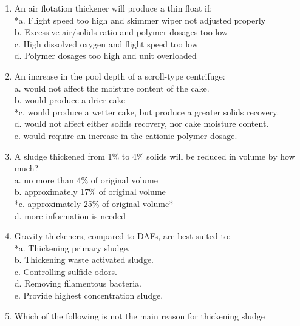 \begin{enumerate}
\item  An air flotation thickener will produce a thin float if: \\

*a. Flight speed too high and skimmer wiper not adjusted properly \\
b. Excessive air/solids ratio and polymer dosages too low \\
c. High dissolved oxygen and flight speed too low \\
d. Polymer dosages too high and unit overloaded \\

\item  An increase in the pool depth of a scroll-type centrifuge: \\

a. would not affect the moisture content of the cake. \\
b. would produce a drier cake \\
*c. would produce a wetter cake, but produce a greater solids recovery. \\
d. would not affect either solids recovery, nor cake moisture content. \\
e. would require an increase in the cationic polymer dosage. \\

\item  A sludge thickened from 1\% to 4\% solids will be reduced in volume by how much? \\

a. no more than 4\% of original volume \\
b. approximately 17\% of original volume \\
*c. approximately 25\% of original volume* \\
d. more information is needed \\

\item  Gravity thickeners, compared to DAFs, are best suited to: \\

*a. Thickening primary sludge. \\
b. Thickening waste activated sludge. \\
c. Controlling sulfide odors. \\
d. Removing filamentous bacteria. \\
e. Provide highest concentration sludge. \\

\item  Which of the following is not the main reason for thickening sludge \\


\end{enumerate}
